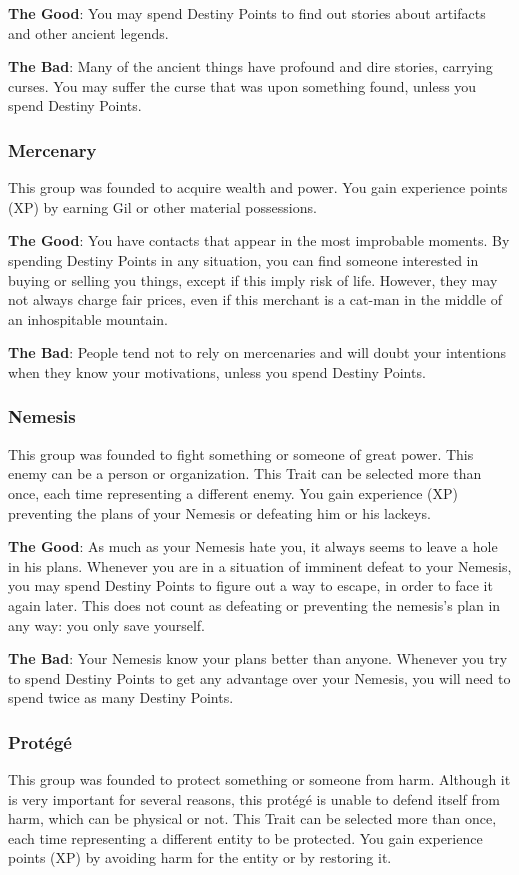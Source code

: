 \textbf{The Good}: You may spend Destiny Points
to find out stories about artifacts and other ancient
legends.

\textbf{The Bad}: Many of the ancient things have
profound and dire stories, carrying curses. You
may suffer the curse that was upon something
found, unless you spend Destiny Points.

\subsubsection{Mercenary}
This group was founded to acquire wealth
and power. You gain experience points (XP) by
earning Gil or other material possessions.

\textbf{The Good}: You have contacts that appear
in the most improbable moments. By spending
Destiny Points in any situation, you can find
someone interested in buying or selling you things,
except if this imply risk of life. However, they may
not always charge fair prices, even if this merchant
is a cat-man in the middle of an inhospitable
mountain.

\textbf{The Bad}: People tend not to rely on
mercenaries and will doubt your intentions when
they know your motivations, unless you spend
Destiny Points.

\subsubsection{Nemesis}
This group was founded to fight something
or someone of great power. This enemy can be a
person or organization. This Trait can be selected
more than once, each time representing a different
enemy. You gain experience (XP) preventing the
plans of your Nemesis or defeating him or his
lackeys.

\textbf{The Good}: As much as your Nemesis hate
you, it always seems to leave a hole in his plans.
Whenever you are in a situation of imminent
defeat to your Nemesis, you may spend Destiny
Points to figure out a way to escape, in order to face
it again later. This does not count as defeating or
preventing the nemesis’s plan in any way: you only
save yourself.

\textbf{The Bad}: Your Nemesis know your plans
better than anyone. Whenever you try to spend
Destiny Points to get any advantage over your
Nemesis, you will need to spend twice as many
Destiny Points.

\subsubsection{Protégé}
This group was founded to protect
something or someone from harm. Although it is
very important for several reasons, this protégé is
unable to defend itself from harm, which can be
physical or not. This Trait can be selected more
than once, each time representing a different
entity to be protected. You gain experience points
(XP) by avoiding harm for the entity or by
restoring it.


